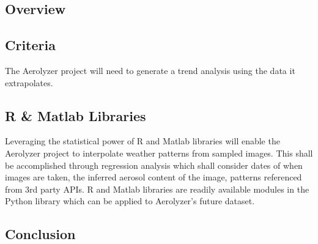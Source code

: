 \documentclass[journal,10pt,draftclsnofoot,onecolumn]{IEEEtran}
\begin{document}
\begin{singlespace}
	\subsection{Overview}

	\subsection{Criteria}
	The Aerolyzer project will need to generate a trend analysis using the data it extrapolates. 

	\subsection{R \& Matlab Libraries}
	Leveraging the statistical power of R and Matlab libraries will enable the Aerolyzer project to interpolate weather patterns from sampled images.
	This shall be accomplished through regression analysis which shall consider dates of when images are taken, the inferred aerosol content of the image, patterns referenced from 3rd party APIs.
	R and Matlab libraries are readily available modules in the Python library which can be applied to Aerolyzer’s future dataset. 

	\subsection{Conclusion}


\end{singlespace}
\end{document}

